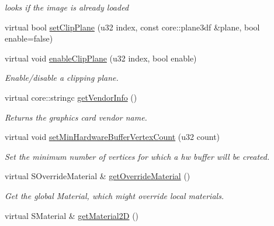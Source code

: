 \begin{DoxyCompactItemize}
\begin{DoxyCompactList}\small\item\em looks if the image is already loaded \end{DoxyCompactList}\item 
virtual bool \hyperlink{classirr_1_1video_1_1_c_null_driver_a4cedb867b40c156136d378c9b12bd78d}{set\-Clip\-Plane} (u32 index, const core\-::plane3df \&plane, bool enable=false)
\item 
virtual void \hyperlink{classirr_1_1video_1_1_c_null_driver_a648eb89a8ba7240ab9cf7d2c0ddda468}{enable\-Clip\-Plane} (u32 index, bool enable)
\begin{DoxyCompactList}\small\item\em Enable/disable a clipping plane. \end{DoxyCompactList}\item 
\hypertarget{classirr_1_1video_1_1_c_null_driver_aa7241b24d4205cd76a98bb0cb22ecb11}{virtual core\-::stringc \hyperlink{classirr_1_1video_1_1_c_null_driver_aa7241b24d4205cd76a98bb0cb22ecb11}{get\-Vendor\-Info} ()}\label{classirr_1_1video_1_1_c_null_driver_aa7241b24d4205cd76a98bb0cb22ecb11}

\begin{DoxyCompactList}\small\item\em Returns the graphics card vendor name. \end{DoxyCompactList}\item 
virtual void \hyperlink{classirr_1_1video_1_1_c_null_driver_a72f5183191e9a45a88ae56d70eabd79a}{set\-Min\-Hardware\-Buffer\-Vertex\-Count} (u32 count)
\begin{DoxyCompactList}\small\item\em Set the minimum number of vertices for which a hw buffer will be created. \end{DoxyCompactList}\item 
virtual S\-Override\-Material \& \hyperlink{classirr_1_1video_1_1_c_null_driver_ad213a14276ae8acc199e50236942abdd}{get\-Override\-Material} ()
\begin{DoxyCompactList}\small\item\em Get the global Material, which might override local materials. \end{DoxyCompactList}\item 
\hypertarget{classirr_1_1video_1_1_c_null_driver_a9fb7ca7aa7848c505d3cd8845d3830c9}{virtual S\-Material \& \hyperlink{classirr_1_1video_1_1_c_null_driver_a9fb7ca7aa7848c505d3cd8845d3830c9}{get\-Material2\-D} ()}\label{classirr_1_1video_1_1_c_null_driver_a9fb7ca7aa7848c505d3cd8845d3830c9}


\end{DoxyCompactItemize}
